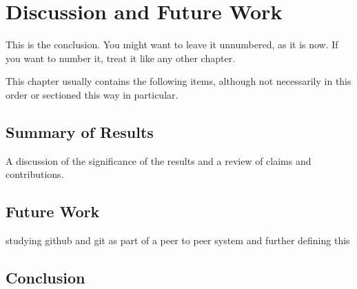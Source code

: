 \chapter{Discussion and Future Work}  
\label{ch:conclusion}

This is the conclusion. You might want to leave it unnumbered, as it is now. If you want to number it, treat it like any other chapter.

This chapter usually contains the following items, although not
necessarily in this order or sectioned this way in particular.

\section{Summary of Results}
A discussion of the significance of the results
and a review of claims and contributions.

\subsection{}
\subsubsection{}

\section{Future Work}

studying github and git as part of a peer to peer system and further defining this 

\section{Conclusion}
